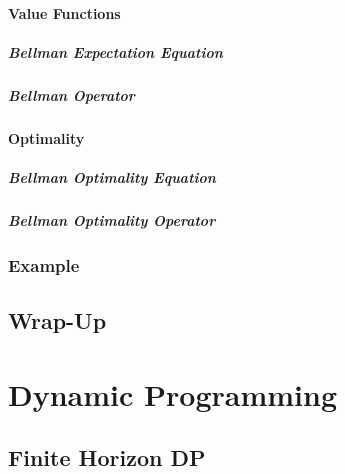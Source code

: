 			\subsubsection{Value Functions} %

				\paragraph{Bellman Expectation Equation} %

				\paragraph{Bellman Operator} %

			\subsubsection{Optimality} %

				\paragraph{Bellman Optimality Equation} %

				\paragraph{Bellman Optimality Operator} %

		\subsection{Example} %

	\section{Wrap-Up} %

\chapter{Dynamic Programming} %

	\section{Finite Horizon DP} %

